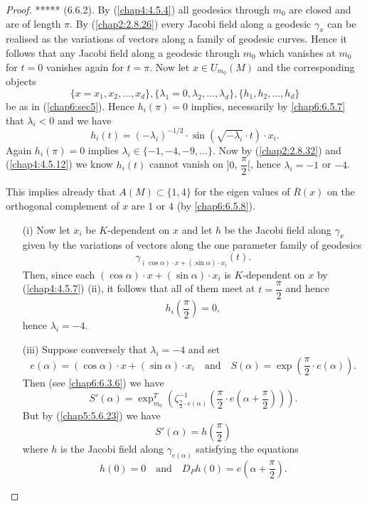 \begin{proof}
***** (6.6.2). By (\ref{chap4:4.5.4}) all geodesics through $m_{0}$ are
closed and are of length $\pi$. By (\ref{chap2:2.8.26}) every Jacobi
field along a geodesic $\gamma_{x}$ can be realised as the variations
of vectors along a family of geodesic curves. Hence it follows that
any Jacobi field along a geodesic through $m_{0}$ which vanishes at
$m_{0}$ for $t=0$ vanishes again for $t=\pi$. Now let $x\in
U_{m_{0}}(M)$ and the corresponding objects
$$
\{x=x_{1},x_{2},\ldots,x_{d}\},
\{\lambda_{1}=0,\lambda_{2},\ldots,\lambda_{d}\},
\{h_{1},h_{2},\ldots,h_{d}\} 
$$ 
be as in (\ref{chap6:sec5}). Hence $h_{i}(\pi)=0$ implies, necessarily by
\eqref{chap6:6.5.7} that $\lambda_{i}<0$ and we have
\begin{equation*}
h_{i}(t)=(-\lambda_{i})^{-1/2}\cdot \sin (\sqrt{-\lambda_{i}}\cdot
t)\cdot x_{i}.\tag{6.6.3}\label{chap6:6.6.3}
\end{equation*}
Again $h_{i}(\pi)=0$ implies $\lambda_{i}\in\{-1,-4,-9,\ldots\}$. Now
by (\ref{chap2:2.8.32}) and (\ref{chap4:4.5.12}) we know $h_{i}(t)$ cannot
vanish on $]0$, $\dfrac{\pi}{2}[$, hence $\lambda_{i}=-1$ or $-4$.

This implies already that $A(M)\subset \{1,4\}$ for the eigen values
of $\overline{R}(x)$ on the orthogonal complement of $x$ are $1$ or
$4$ (by \eqref{chap6:6.5.8}).
\begin{itemize}
\item[(i)] Now let $x_{i}$ be $K$-dependent on $x$ and let $h$ be the
  Jacobi field along $\gamma_{x}$ given by the variations of vectors
  along the one parameter family of geodesics
$$
\gamma_{(\cos\alpha)\cdot x+(\sin\alpha)\cdot x_{i}}(t).
$$
Then, \pageoriginale since each $(\cos\alpha)\cdot x+(\sin\alpha)\cdot
x_{i}$ is $K$-dependent on $x$ by (\ref{chap4:4.5.7}) (ii), it follows
that all of them meet at $t=\dfrac{\pi}{2}$ and hence
$$
h_{i}\left(\frac{\pi}{2}\right)=0,
$$
hence $\lambda_{i}=-4$.

\item[(iii)] Suppose conversely that $\lambda_{i}=-4$ and set
$$
e(\alpha)=(\cos\alpha)\cdot x+(\sin \alpha)\cdot
x_{i}\quad\text{and}\quad S(\alpha)=\exp\left(\frac{\pi}{2}\cdot
e(\alpha)\right). 
$$
Then (see \eqref{chap6:6.3.6}) we have
$$
S'(\alpha)=\exp^{T}_{m_{0}}\left(\zeta^{-1}_{\frac{\pi}{2}\cdot
  e(\alpha)}\left(\frac{\pi}{2}\cdot
e\left(\alpha+\frac{\pi}{2}\right)\right)\right). 
$$
But by (\ref{chap5:5.6.23}) we have
\begin{equation*}
S'(\alpha)=h\left(\frac{\pi}{2}\right)\tag{6.6.6}\label{chap6:6.6.6}
\end{equation*}
where $h$ is the Jacobi field along $\gamma_{e(\alpha)}$ satisfying
the equations
$$
h(0)=0\quad\text{and}\quad D_{P}h(0)=e\left(\alpha+\frac{\pi}{2}\right).
$$


\end{itemize}
\end{proof}
